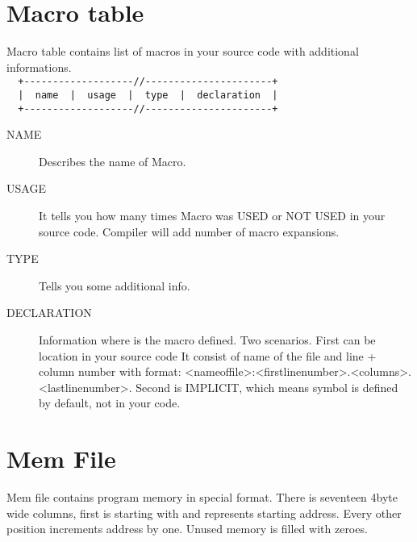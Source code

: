 \section{Macro table}
    Macro table contains list of macros in your source code with additional informations.\\
    {
        \usecodefont
        \verb'  +-------------------//----------------------+'\\
        \verb'  |  name  |  usage  |  type  |  declaration  |'\\
        \verb'  +-------------------//----------------------+'\\
    }

    \begin{description}
        \item[NAME]
            Describes the name of Macro.
        \item[USAGE]
            It tells you how many times Macro was USED or NOT USED in your source code. Compiler will add number of macro expansions.
        \item[TYPE]
            Tells you some additional info.
        \item[DECLARATION]
            Information where is the macro defined. Two scenarios. First can be location in your source code It consist of name of the file and line + column number with format: <nameoffile>:<firstlinenumber>.<columns>.<lastlinenumber>. Second is IMPLICIT, which means symbol is defined by default, not in your code.
    \end{description}

\section{Mem File}
    Mem file contains program memory in special format. There is seventeen 4byte wide columns, first is starting with \@ and represents starting address. Every other position increments address by one. Unused memory is filled with zeroes.

